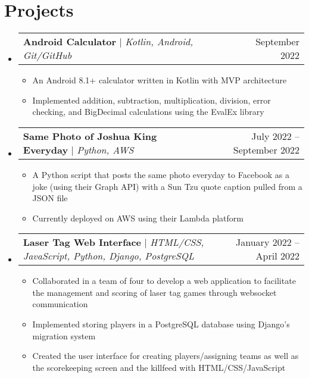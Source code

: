 \documentclass[letterpaper,11pt]{article}
\makeatletter
\newcommand{\resumeItem}[1]{
  \item\small{
    {#1 \vspace{-2pt}}
  }
}
\newcommand{\resumeProjectHeading}[2]{
    \item
    \begin{tabular*}{0.97\textwidth}{l@{\extracolsep{\fill}}r}
      \small#1 & #2 \\
    \end{tabular*}\vspace{-7pt}
}
\newcommand{\resumeSubHeadingListStart}{\begin{itemize}[leftmargin=0.15in, label={}]}
\newcommand{\resumeSubHeadingListEnd}{\end{itemize}}
\newcommand{\resumeItemListStart}{\begin{itemize}}
\newcommand{\resumeItemListEnd}{\end{itemize}\vspace{-5pt}}
\makeatother
\begin{document}
\section{Projects}
    \resumeSubHeadingListStart
      \resumeProjectHeading
          {\textbf{Android Calculator} $|$ \emph{Kotlin, Android, Git/GitHub}}{September 2022}
          \resumeItemListStart
            \resumeItem{An Android 8.1+ calculator written in Kotlin with MVP architecture}
            \resumeItem{Implemented addition, subtraction, multiplication, division, error checking, and BigDecimal calculations using the EvalEx library}
          \resumeItemListEnd
      \resumeProjectHeading
          {\textbf{Same Photo of Joshua King Everyday} $|$ \emph{Python, AWS}}{July 2022 -- September 2022}
          \resumeItemListStart
            \resumeItem{A Python script that posts the same photo everyday to Facebook as a joke (using their Graph API) with a Sun Tzu quote caption pulled from a JSON file}
            \resumeItem{Currently deployed on AWS using their Lambda platform}
          \resumeItemListEnd
      \resumeProjectHeading
          {\textbf{Laser Tag Web Interface} $|$ \emph{HTML/CSS, JavaScript, Python, Django, PostgreSQL}}{January 2022 -- April 2022}
          \resumeItemListStart
            \resumeItem{Collaborated in a team of four to develop a web application to facilitate the management and scoring of laser tag games through websocket communication}
            \resumeItem{Implemented storing players in a PostgreSQL database using Django's migration system}
            \resumeItem{Created the user interface for creating players/assigning teams as well as the scorekeeping screen and the killfeed with HTML/CSS/JavaScript}
          \resumeItemListEnd
    \resumeSubHeadingListEnd



%



\end{document}

